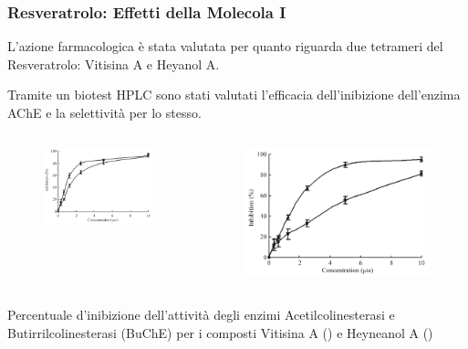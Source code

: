 \documentclass[9pt]{beamer}
\begin{document}
\begin{frame}
	\frametitle{Resveratrolo: Effetti della Molecola I}
	L'azione farmacologica è stata valutata per quanto riguarda due tetrameri del Resveratrolo: Vitisina A e Heyanol A.
	
	Tramite un biotest HPLC sono stati valutati l'efficacia dell'inibizione dell'enzima AChE e la selettività per lo stesso.
	
	\begin{columns}
		\begin{column}{0.5\textwidth}
			\begin{figure}
				\includegraphics[width=\textwidth]{immagini/risache_resveratrolo.png}
			\end{figure}
		\end{column}
		\begin{column}{0.5\textwidth}
			\begin{figure}
				\includegraphics[width=\textwidth]{immagini/risbuche_resveratrolo.png}
			\end{figure}
		\end{column}
	\end{columns}
	Percentuale d'inibizione dell'attività degli enzimi Acetilcolinesterasi e Butirrilcolinesterasi (BuChE) per i composti Vitisina A () e Heyneanol A ()
\end{frame}
\end{document}
